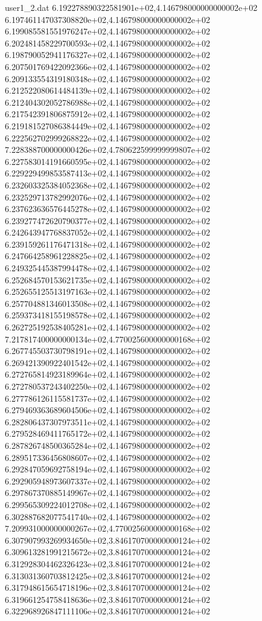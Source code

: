 \begin{filecontents}{user1_2.dat}
6.192278890322581901e+02,4.146798000000000002e+02
6.197461147037308820e+02,4.146798000000000002e+02
6.199085581551976247e+02,4.146798000000000002e+02
6.202481458229700593e+02,4.146798000000000002e+02
6.198790052941176327e+02,4.146798000000000002e+02
6.207501769422092366e+02,4.146798000000000002e+02
6.209133554319180348e+02,4.146798000000000002e+02
6.212522080614484139e+02,4.146798000000000002e+02
6.212404302052786988e+02,4.146798000000000002e+02
6.217542391806875912e+02,4.146798000000000002e+02
6.219181527086384449e+02,4.146798000000000002e+02
6.222562702999268822e+02,4.146798000000000002e+02
7.228388700000000426e+02,4.780622599999999807e+02
6.227583014191660595e+02,4.146798000000000002e+02
6.229229499853587413e+02,4.146798000000000002e+02
6.232603325384052368e+02,4.146798000000000002e+02
6.232529713782992076e+02,4.146798000000000002e+02
6.237623636576445278e+02,4.146798000000000002e+02
6.239277472620790377e+02,4.146798000000000002e+02
6.242643947768837052e+02,4.146798000000000002e+02
6.239159261176471318e+02,4.146798000000000002e+02
6.247664258961228825e+02,4.146798000000000002e+02
6.249325445387994478e+02,4.146798000000000002e+02
6.252684570153621735e+02,4.146798000000000002e+02
6.252655125513197163e+02,4.146798000000000002e+02
6.257704881346013508e+02,4.146798000000000002e+02
6.259373418155198578e+02,4.146798000000000002e+02
6.262725192538405281e+02,4.146798000000000002e+02
7.217817400000000134e+02,4.770025600000000168e+02
6.267745503730798191e+02,4.146798000000000002e+02
6.269421390922401542e+02,4.146798000000000002e+02
6.272765814923189964e+02,4.146798000000000002e+02
6.272780537243402250e+02,4.146798000000000002e+02
6.277786126115581737e+02,4.146798000000000002e+02
6.279469363689604506e+02,4.146798000000000002e+02
6.282806437307973511e+02,4.146798000000000002e+02
6.279528469411765172e+02,4.146798000000000002e+02
6.287826748500365284e+02,4.146798000000000002e+02
6.289517336456808607e+02,4.146798000000000002e+02
6.292847059692758194e+02,4.146798000000000002e+02
6.292905948973607337e+02,4.146798000000000002e+02
6.297867370885149967e+02,4.146798000000000002e+02
6.299565309224012708e+02,4.146798000000000002e+02
6.302887682077541740e+02,4.146798000000000002e+02
7.209931000000000267e+02,4.770025600000000168e+02
6.307907993269934650e+02,3.846170700000000124e+02
6.309613281991215672e+02,3.846170700000000124e+02
6.312928304462326423e+02,3.846170700000000124e+02
6.313031360703812425e+02,3.846170700000000124e+02
6.317948615654718196e+02,3.846170700000000124e+02
6.319661254758418636e+02,3.846170700000000124e+02
6.322968926847111106e+02,3.846170700000000124e+02

\end{filecontents}
